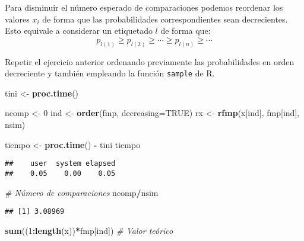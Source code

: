 \documentclass[
]{book}
\newenvironment{Shaded}{\begin{snugshade}}{\end{snugshade}}
\newcommand{\CommentTok}[1]{\textcolor[rgb]{0.56,0.35,0.01}{\textit{#1}}}
\newcommand{\DataTypeTok}[1]{\textcolor[rgb]{0.13,0.29,0.53}{#1}}
\newcommand{\DecValTok}[1]{\textcolor[rgb]{0.00,0.00,0.81}{#1}}
\newcommand{\KeywordTok}[1]{\textcolor[rgb]{0.13,0.29,0.53}{\textbf{#1}}}
\newcommand{\NormalTok}[1]{#1}
\newcommand{\OperatorTok}[1]{\textcolor[rgb]{0.81,0.36,0.00}{\textbf{#1}}}
\newcommand{\OtherTok}[1]{\textcolor[rgb]{0.56,0.35,0.01}{#1}}
\newcommand{\StringTok}[1]{\textcolor[rgb]{0.31,0.60,0.02}{#1}}
\theoremstyle{break}
\theoremstyle{definition}
\theoremstyle{definition}
\theoremstyle{definition}
\theoremstyle{remark}
\let\BeginKnitrBlock\begin \let\EndKnitrBlock\end
\begin{document}
Para disminuir el número esperado de comparaciones podemos
reordenar los valores \(x_{i}\) de forma que las probabilidades
correspondientes sean decrecientes. Esto equivale a considerar
un etiquetado \(l\) de forma que:
\[p_{l\left( 1\right) }\geq p_{l\left( 2\right) }\geq \cdots \geq p_{l\left(
n\right) }\geq \cdots\]

\BeginKnitrBlock{exercise}
\protect\hypertarget{exr:unnamed-chunk-16}{}{\label{exr:unnamed-chunk-16} }
\EndKnitrBlock{exercise}

Repetir el ejercicio anterior ordenando previamente las
probabilidades en orden decreciente y también empleando la
función \texttt{sample} de R.

\begin{Shaded}
\begin{Highlighting}[]
\NormalTok{tini <-}\StringTok{ }\KeywordTok{proc.time}\NormalTok{()}

\NormalTok{ncomp <-}\StringTok{ }\DecValTok{0}
\NormalTok{ind <-}\StringTok{ }\KeywordTok{order}\NormalTok{(fmp, }\DataTypeTok{decreasing=}\OtherTok{TRUE}\NormalTok{)}
\NormalTok{rx <-}\StringTok{ }\KeywordTok{rfmp}\NormalTok{(x[ind], fmp[ind], nsim)}

\NormalTok{tiempo <-}\StringTok{ }\KeywordTok{proc.time}\NormalTok{() }\OperatorTok{-}\StringTok{ }\NormalTok{tini}
\NormalTok{tiempo}
\end{Highlighting}
\end{Shaded}

\begin{verbatim}
##    user  system elapsed 
##    0.05    0.00    0.05
\end{verbatim}

\begin{Shaded}
\begin{Highlighting}[]
\CommentTok{# Número de comparaciones}
\NormalTok{ncomp}\OperatorTok{/}\NormalTok{nsim}
\end{Highlighting}
\end{Shaded}

\begin{verbatim}
## [1] 3.08969
\end{verbatim}

\begin{Shaded}
\begin{Highlighting}[]
\KeywordTok{sum}\NormalTok{((}\DecValTok{1}\OperatorTok{:}\KeywordTok{length}\NormalTok{(x))}\OperatorTok{*}\NormalTok{fmp[ind]) }\CommentTok{# Valor teórico}
\end{Highlighting}
\end{Shaded}
\end{document}
